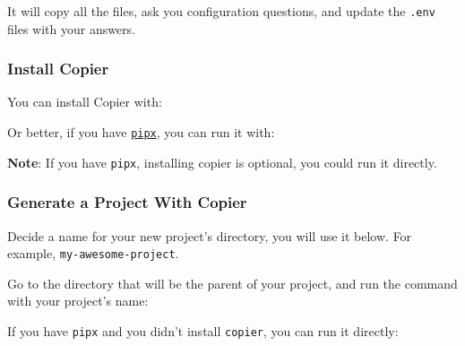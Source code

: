 It will copy all the files, ask you configuration questions, and update
the \texttt{.env} files with your answers.

\hypertarget{install-copier}{%
\subsubsection{Install Copier}\label{install-copier}}

You can install Copier with:

\begin{Shaded}
\begin{Highlighting}[]
\end{Highlighting}
\end{Shaded}

Or better, if you have \href{https://pipx.pypa.io/}{\texttt{pipx}}, you
can run it with:

\begin{Shaded}
\begin{Highlighting}[]
\end{Highlighting}
\end{Shaded}

\textbf{Note}: If you have \texttt{pipx}, installing copier is optional,
you could run it directly.

\hypertarget{generate-a-project-with-copier}{%
\subsubsection{Generate a Project With
Copier}\label{generate-a-project-with-copier}}

Decide a name for your new project's directory, you will use it below.
For example, \texttt{my-awesome-project}.

Go to the directory that will be the parent of your project, and run the
command with your project's name:

\begin{Shaded}
\begin{Highlighting}[]
\end{Highlighting}
\end{Shaded}

If you have \texttt{pipx} and you didn't install \texttt{copier}, you
can run it directly:

